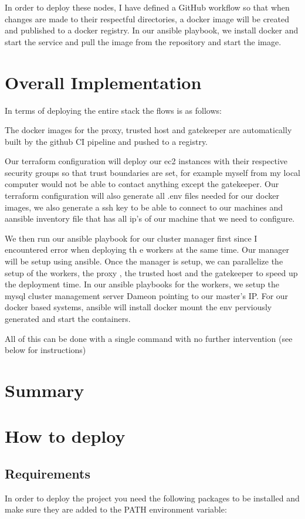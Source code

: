\documentclass[11pt]{article}
\begin{document}
In order to deploy these nodes, I have defined a GitHub workflow so that when changes are made to their respectful directories, a docker image will be created and published to a docker registry. In our ansible playbook, we install docker and start the service and pull the image from the repository and start the image.

\section{Overall Implementation}
In terms of deploying the entire stack the flows is as follows:
\newline

The docker images for the proxy, trusted host and gatekeeper are automatically built by the github CI pipeline and pushed to a registry.

Our terraform configuration will deploy our ec2 instances with their respective security groups so that trust boundaries are set, for example myself from my local computer would not be able to contact anything except the gatekeeper. Our terraform configuration will also generate all .env files needed for our docker images, we also generate a ssh key to be able to connect to our machines and aansible inventory file that has all ip's of our machine that we need to configure.

We then run our ansible playbook for our cluster manager first since I encountered error when deploying th e workers at the same time. Our manager will be setup using ansible. Once the manager is setup, we can parallelize the setup of the workers, the proxy , the trusted host and the gatekeeper to speed up the deployment time. In our ansible playbooks for the workers, we setup the mysql cluster management server Dameon pointing to our master's IP. For our docker based systems, ansible will install docker mount the env perviously generated and start the containers.

All of this can be done with a single command with no further intervention (see below for instructions)

\section{Summary}

\section{How to deploy}
\subsection{Requirements}
In order to deploy the project you need the following packages to be installed and make sure they are added to the PATH environment variable:
\end{document}
